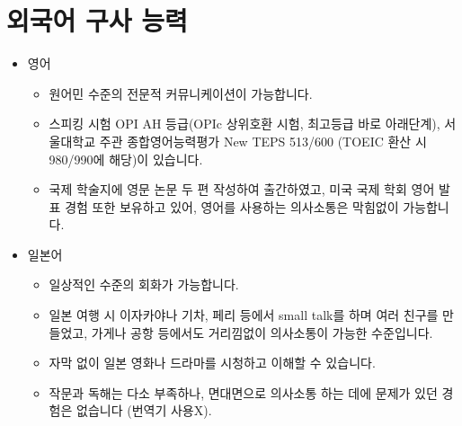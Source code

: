 


\section*{외국어 구사 능력}
\begin{itemize}
    \item 영어
          \begin{itemize}
              \item 원어민 수준의 전문적 커뮤니케이션이 가능합니다.
              \item 스피킹 시험 OPI AH 등급(OPIc 상위호환 시험, 최고등급 바로 아래단계), 서울대학교 주관 종합영어능력평가 New TEPS 513/600 (TOEIC 환산 시 980/990에 해당)이 있습니다.
              \item 국제 학술지에 영문 논문 두 편 작성하여 출간하였고, 미국 국제 학회 영어 발표 경험 또한 보유하고 있어, 영어를 사용하는 의사소통은 막힘없이 가능합니다.
          \end{itemize}
    \item 일본어
          \begin{itemize}
              \item 일상적인 수준의 회화가 가능합니다.
              \item 일본 여행 시 이자카야나 기차, 페리 등에서 small talk를 하며 여러 친구를 만들었고, 가게나 공항 등에서도 거리낌없이 의사소통이 가능한 수준입니다.
              \item 자막 없이 일본 영화나 드라마를 시청하고 이해할 수 있습니다.
              \item 작문과 독해는 다소 부족하나, 면대면으로 의사소통 하는 데에 문제가 있던 경험은 없습니다 (번역기 사용X).
          \end{itemize}
\end{itemize}

